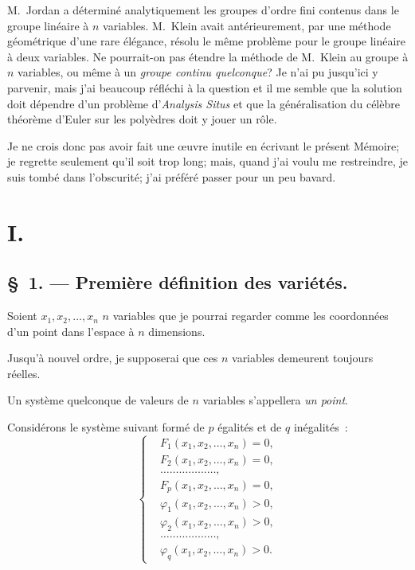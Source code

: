 \documentclass{article}
\begin{document}
M.~Jordan a déterminé analytiquement les groupes d'ordre fini contenus dans le groupe linéaire à $n$ variables. M.~Klein avait antérieurement, par une méthode géométrique d'une rare élégance, résolu le même problème pour le groupe linéaire à deux variables. Ne pourrait-on pas étendre la méthode de M.~Klein au groupe à $n$ variables, ou même à un \emph{groupe continu quelconque}? Je n'ai pu jusqu'ici y parvenir, mais j'ai beaucoup réfléchi à la question et il me semble que la solution doit dépendre d'un problème d'\emph{Analysis Situs} et que la généralisation du célèbre théorème d'Euler sur les polyèdres doit y jouer un rôle.

Je ne crois donc pas avoir fait une œuvre inutile en écrivant le présent Mémoire; je regrette seulement qu'il soit trop long; mais, quand j'ai voulu me restreindre, je suis tombé dans l'obscurité; j'ai préféré passer pour un peu bavard.

\section*{I.}

\subsection*{\S~1. --- Première définition des variétés.}

Soient $x_{1}, x_{2}, \ldots, x_{n}$ $n$ variables que je pourrai regarder comme les coordonnées d'un point dans l'espace à $n$ dimensions.

Jusqu'à nouvel ordre, je supposerai que ces $n$ variables demeurent toujours réelles.

Un système quelconque de valeurs de $n$ variables s'appellera \emph{un point}.

Considérons le système suivant formé de $p$ égalités et de $q$ inégalités~:
\[
\left\{
\begin{aligned}
&F_{1}(x_{1}, x_{2}, \ldots, x_{n}) = 0,\\
&F_{2}(x_{1}, x_{2}, \ldots, x_{n}) = 0,\\
&\ldots\ldots\ldots\ldots\ldots\ldots,\\
&F_{p}(x_{1}, x_{2}, \ldots, x_{n}) = 0,\\
&\varphi_{1}(x_{1}, x_{2}, \ldots, x_{n}) > 0,\\
&\varphi_{2}(x_{1}, x_{2}, \ldots, x_{n}) > 0,\\
&\ldots\ldots\ldots\ldots\ldots\ldots,\\
&\varphi_{q}(x_{1}, x_{2}, \ldots, x_{n}) > 0.
\end{aligned}
\right.
\tag{1}
\]
\end{document}

